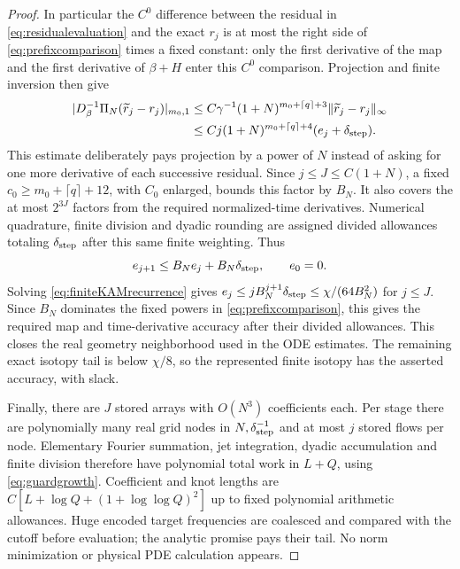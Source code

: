 \documentclass[11pt,a4paper]{amsart}
\theoremstyle{definition}
\theoremstyle{remark}
\numberwithin{equation}{section}
\newcommand{\norm}[1]{\lVert #1\rVert}
\begin{document}
\begin{proof}
In particular the $C^0$ difference between the residual in \eqref{eq:residualevaluation} and the exact $r_j$ is at most the right side of \eqref{eq:prefixcomparison} times a fixed constant: only the first derivative of the map and the first derivative of $\beta+H$ enter this $C^0$ comparison. Projection and finite inversion then give
\begin{align*}
 |D_\beta^{-1}\Pi_N(\widetilde r_j-r_j)|_{m_0,1}
 &\le C\gamma^{-1}(1+N)^{m_0+\lceil q\rceil+3}
                         \norm{\widetilde r_j-r_j}_\infty\\
 &\le Cj(1+N)^{m_0+\lceil q\rceil+4}
                           (e_j+\delta_{\rm step}).
\end{align*}
This estimate deliberately pays projection by a power of $N$ instead of asking for one more derivative of each successive residual. Since $j\le J\le C(1+N)$, a fixed
$c_0\ge m_0+\lceil q\rceil+12$, with $C_0$ enlarged, bounds this factor by $B_N$. It also covers the at most $2^{3J}$ factors from the required normalized-time derivatives. Numerical quadrature, finite division and dyadic rounding are assigned divided allowances totaling $\delta_{\rm step}$ after this same finite weighting. Thus
\begin{equation}\label{eq:finiteKAMrecurrence}
 e_{j+1}\le B_N e_j+B_N\delta_{\rm step},\qquad e_0=0.
\end{equation}
Solving \eqref{eq:finiteKAMrecurrence} gives
$e_j\le jB_N^{j+1}\delta_{\rm step}\le\chi/(64B_N^2)$ for $j\le J$. Since $B_N$ dominates the fixed powers in \eqref{eq:prefixcomparison}, this gives the required map and time-derivative accuracy after their divided allowances. This closes the real geometry neighborhood used in the ODE estimates. The remaining exact isotopy tail is below $\chi/8$, so the represented finite isotopy has the asserted accuracy, with slack.

Finally, there are $J$ stored arrays with $O(N^3)$ coefficients each. Per stage there are polynomially many real grid nodes in $N,\delta_{\rm step}^{-1}$ and at most $j$ stored flows per node. Elementary Fourier summation, jet integration, dyadic accumulation and finite division therefore have polynomial total work in $L+Q$, using \eqref{eq:guardgrowth}. Coefficient and knot lengths are $C[L+\log Q+(1+\log\log Q)^2]$ up to fixed polynomial arithmetic allowances. Huge encoded target frequencies are coalesced and compared with the cutoff before evaluation; the analytic promise pays their tail. No norm minimization or physical PDE calculation appears.
\end{proof}
\end{document}
